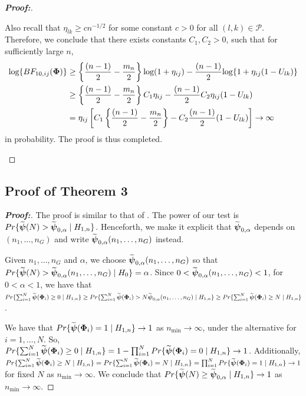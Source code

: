 \documentclass[alpha-refs]{wiley-article}
\theoremstyle{plain}%
\theoremstyle{definition}
\def\log{\hbox{log}}
\def\log{\hbox{log}}
\def\boldpsi{{\mbox{\boldmath $\psi$}}}
\newcommand{\uPhi}              {\mbox{\boldmath$\Phi$}}
\begin{document}
\begin{proof}[\textbf{\upshape Proof:}]
\begin{description}
{Also recall that $\eta_{lk} \geq cn^{-1/2}$ for some constant $c > 0$ for all $(l,k)\in\mathcal{P}$. Therefore, we conclude that there exists constants $C_1, C_2 > 0$, such that for sufficiently large $n$,
\begin{align*}
    \log\{BF_{10, ij}(\uPhi) \} & \geq \left\{\frac{(n - 1)}{2} - \frac{m_n}{2}\right\}\log(1 + \eta_{ij}) - \frac{(n - 1)}{2}\log\{1 + \eta_{ij}(1 - U_{lk})\}\\
    &\geq \left\{\frac{(n - 1)}{2} - \frac{m_n}{2}\right\}C_1\eta_{ij} - \frac{(n - 1)}{2}C_2\eta_{ij}(1 - U_{lk})\\
    & = \eta_{ij}\left[C_1\left\{\frac{(n - 1)}{2} - \frac{m_n}{2}\right\} - C_2\frac{(n - 1)}{2}(1 - U_{lk})\right]\to \infty
\end{align*}
in probability. The proof is thus completed. 
}

\end{description}
\end{proof}


\subsection*{Proof of Theorem 3}

\begin{proof}[\textbf{\upshape Proof:}]
The proof is similar to that of \cite{zoh2018powerful}. %
The power of our test is $Pr\{ \widetilde{\boldpsi}(N) > \widetilde{\boldpsi}_{0,\alpha}\mid  H_{1,n}\}$.
Henceforth, we make it explicit that $\widetilde{\boldpsi}_{0,\alpha}$ depends on $(n_1, \ldots ,n_G)$ and write $\widetilde{\boldpsi}_{0,\alpha}(n_1, \ldots, n_G)$ instead.

Given $n_1, \ldots, n_G$ and $\alpha$, we choose $\widetilde{\boldpsi}_{0,\alpha}(n_1, \ldots, n_G)$ so that $Pr\{\widetilde{\boldpsi}(N) > \widetilde{\boldpsi}_{0, \alpha}(n_1, \ldots,n_G)\mid  H_{0}\}  = \alpha$.
Since $ 0 < \widetilde{\boldpsi}_{0,\alpha}(n_1, \ldots,n_G) < 1$, for $0 < \alpha < 1$, we have that $Pr\{ \sum^{N}_{i=1}\widetilde{\boldpsi}(\uPhi_i) \geq 0 \mid H_{1,n} \} \geq Pr\{ \sum^{N}_{i=1}\widetilde{\boldpsi}(\uPhi_i) > N\widetilde{\boldpsi}_{0,\alpha}(n_1, \ldots ,n_G) \mid H_{1,n} \} \geq Pr\{ \sum^{N}_{i=1}\widetilde{\boldpsi}(\uPhi_i) \geq N \mid H_{1,n} \}$.

We have that $Pr\{\widetilde{\boldpsi}(\uPhi_i) =1 \mid H_{1,n}\} \rightarrow 1$ as $n_{\min} \rightarrow \infty$, under the alternative for $i = 1, \ldots, N$. So, $Pr\{ \sum^{N}_{i=1}\widetilde{\boldpsi}(\uPhi_i) \geq 0 \mid H_{1,n} \} = 1 - \prod_{i=1}^{N}Pr\{\widetilde{\boldpsi}(\uPhi_i) = 0 \mid H_{1,n} \} \rightarrow 1$.
Additionally, $Pr\{ \sum^{N}_{i=1}\widetilde{\boldpsi}(\uPhi_i) \geq N \mid H_{1,n} \} = Pr\{ \sum^{N}_{i=1}\widetilde{\boldpsi}(\uPhi_i) = N \mid H_{1,n} \} = \prod_{i=1}^{N}Pr\{\widetilde{\boldpsi}(\uPhi_i) = 1 \mid H_{1,n}\} \rightarrow 1$ for fixed $N$ as $n_{\min} \rightarrow \infty$. We conclude that $Pr\{ \widetilde{\boldpsi}(N) \geq \widetilde{\boldpsi}_{0, \alpha}\mid  H_{1,n}\} \rightarrow 1$ as $n_{\min} \rightarrow \infty.$
\end{proof}
\end{document}
